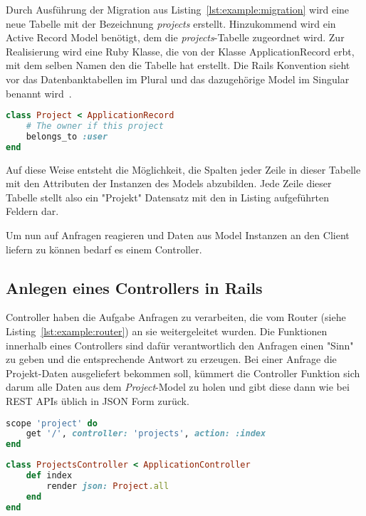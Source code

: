 Durch Ausführung der Migration aus Listing~\ref{lst:example:migration} wird eine neue Tabelle mit der Bezeichnung \emph{projects} erstellt.
Hinzukommend wird ein Active Record Model benötigt, dem die \emph{projects}-Tabelle zugeordnet wird.
Zur Realisierung wird eine Ruby Klasse, die
von der Klasse ApplicationRecord erbt, mit dem selben Namen den die Tabelle hat erstellt.
Die Rails Konvention sieht vor das Datenbanktabellen im Plural und das dazugehörige Model im Singular benannt wird~\cite{rails-naming-convention}.

\begin{lstlisting}[language=Ruby,float=h!,caption={Model}, label={lst:example:model}]
class Project < ApplicationRecord
	# The owner if this project
	belongs_to :user
end
\end{lstlisting}

Auf diese Weise entsteht die Möglichkeit, die Spalten jeder Zeile in dieser Tabelle mit den Attributen der Instanzen des Models abzubilden.
Jede Zeile dieser Tabelle stellt also ein "Projekt" Datensatz mit den in Listing  aufgeführten Feldern dar.

Um nun auf Anfragen reagieren und Daten aus Model Instanzen an den Client liefern zu können bedarf es einem Controller.

\subsection{Anlegen eines Controllers in Rails}
\label{sec:requirements:example:controller}
Controller haben die Aufgabe Anfragen zu verarbeiten, die vom Router (siehe Listing~\ref{lst:example:router}) an sie weitergeleitet wurden.
Die Funktionen innerhalb eines Controllers sind dafür verantwortlich den Anfragen einen "Sinn" zu geben und die entsprechende Antwort zu erzeugen.
Bei einer Anfrage die Projekt-Daten ausgeliefert bekommen soll, kümmert die Controller Funktion sich darum alle Daten aus dem \emph{Project}-Model
zu holen und gibt diese dann wie bei REST APIs üblich in JSON Form zurück.

\begin{lstlisting}[language=Ruby,float=h!,caption={Route entspricht URL '/project/' und leitet Anfrage an die ProjectsController Funktion \emph{index} weiter }, label={lst:example:router}]
scope 'project' do
	get '/', controller: 'projects', action: :index
end
\end{lstlisting}

\begin{lstlisting}[language=Ruby,float=h!,caption={Controller mit Funktion zum zurückgeben aller Project Instanzen}, label={lst:example:controller}]
class ProjectsController < ApplicationController
	def index
		render json: Project.all
	end
end
\end{lstlisting}

